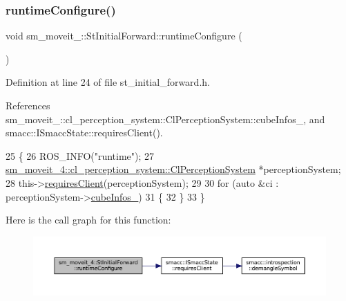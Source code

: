 \subsubsection{\texorpdfstring{runtime\+Configure()}{runtimeConfigure()}}
{\footnotesize\ttfamily void sm\+\_\+moveit\+\_\+::\+St\+Initial\+Forward\+::runtime\+Configure (\begin{DoxyParamCaption}{ }\end{DoxyParamCaption})\hspace{0.3cm}{\ttfamily [inline]}}



Definition at line 24 of file st\+\_\+initial\+\_\+forward.\+h.



References sm\+\_\+moveit\+\_\+::cl\+\_\+perception\+\_\+system\+::\+Cl\+Perception\+System\+::cube\+Infos\+\_\+, and smacc\+::\+I\+Smacc\+State\+::requires\+Client().


\begin{DoxyCode}
25         \{
26             ROS\_INFO(\textcolor{stringliteral}{"runtime"});
27             \hyperlink{classsm__moveit__4_1_1cl__perception__system_1_1ClPerceptionSystem}{sm\_moveit\_4::cl\_perception\_system::ClPerceptionSystem}
       *perceptionSystem;
28             this->\hyperlink{classsmacc_1_1ISmaccState_a7f95c9f0a6ea2d6f18d1aec0519de4ac}{requiresClient}(perceptionSystem);
29 
30             \textcolor{keywordflow}{for} (\textcolor{keyword}{auto} &ci : perceptionSystem->\hyperlink{classsm__moveit__4_1_1cl__perception__system_1_1ClPerceptionSystem_ac4a5ed3c9acd94895b1986c55210da84}{cubeInfos\_})
31             \{
32             \}
33         \}
\end{DoxyCode}
Here is the call graph for this function\+:
\nopagebreak
\begin{figure}[H]
\begin{center}
\leavevmode
\includegraphics[width=350pt]{structsm__moveit__4_1_1StInitialForward_a4544db81cd390202f6321ad526a8a032_cgraph}
\end{center}
\end{figure}
\mbox{\label{structsm__moveit__4_1_1StInitialForward_ac6ba8bd1b48a5a1cd62bf33377cdb9ce}} 
